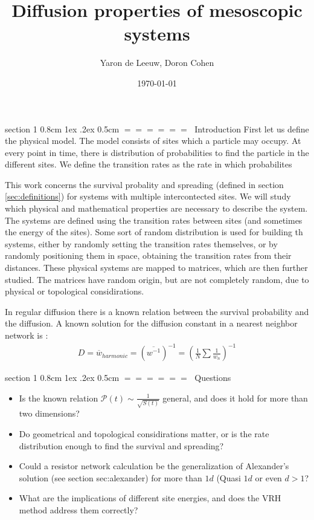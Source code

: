 \documentclass[onecolumn,fleqn,notitlepage,secnumarabic]{revtex4}
\makeatletter
\def\section{%
  \@startsection
    {section}%
    {1}%
    {\z@}%
    {0.8cm \@plus1ex \@minus .2ex}%
    {0.5cm}%
    {\Large\bf $=\!=\!=\!=\!=\!=\;$}%
}%
\makeatother
\begin{document}
\title{Diffusion properties of mesoscopic systems}

\author{Yaron de Leeuw, Doron Cohen}
\date{\today}
\maketitle



\section{Introduction}
First let us define the physical model. The model consists of sites which a particle may occupy. At every point in time, there is distribution of probabilities to find the particle in the different sites. We define the transition rates as the rate in which probabilites

This work concerns the survival probality and spreading (defined in section \ref{sec:definitions}) for systems with multiple intercontected sites. We will study which physical and mathematical properties are necessary to describe the system. The systems are defined using the transition rates between sites (and sometimes the energy of the sites). Some sort of random distribution is used for building th systems, either by randomly setting the transition rates themselves, or by randomly positioning them in space, obtaining the transition rates from their distances. These physical systems are mapped to matrices, which are then further studied. The matrices have random origin, but are not completely random, due to physical or topological considirations.


In regular diffusion there is a known relation between the survival probability and the diffusion. 
A known solution for the diffusion constant in a nearest neighbor network is \cite{Derrida:1983}:
\begin{align}
D=\overline{w}_{harmonic} =(\overline{w^{-1}})^{-1}=\left(\frac{1}{N}\sum\frac{1}{w_n}\right)^{-1}
\end{align}

\section{Questions}
\begin{itemize}
    \item Is the known relation $\mathcal{P}(t) \sim \frac{1}{\sqrt{S(t)}}$ general, and does it hold for more than two dimensions?
    \item Do geometrical and topological considirations matter, or is the rate distribution enough to find the survival and spreading?
    \item Could a resistor network calculation be the generalization of Alexander's solution (see section {sec:alexander}) for more than $1d$ (Quasi $1d$ or even $d>1$?
    \item What are the implications of different site energies, and does the VRH method address them correctly?
\end{itemize}
\end{document}
